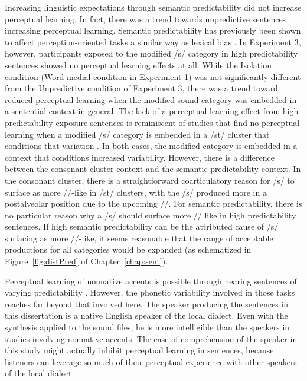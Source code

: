Increasing linguistic expectations through semantic predictability did not increase perceptual learning.
In fact, there was a trend towards unpredictive sentences increasing perceptual learning.
Semantic predictability has previously been shown to affect perception-oriented tasks a similar way as lexical bias \citep{Connine1987, Borsky1998}.
In Experiment 3, however, participants exposed to the modified /s/ category in high predictability sentences showed no perceptual learning effects at all.
While the Isolation condition (Word-medial condition in Experiment 1) was not significantly different from the Unpredictive condition of Experiment 3, there was a trend toward reduced perceptual learning when the modified sound category was embedded in a sentential context in general.
The lack of a perceptual learning effect from high predictability exposure sentences is reminiscent of studies that find no perceptual learning when a modified /s/ category is embedded in a /st\textturnr/ cluster that conditions that variation \citep{Kraljic2008a}.
In both cases, the modified category is embedded in a context that conditions increased variability.
However, there is a difference between the consonant cluster context and the semantic predictability context.
In the consonant cluster, there is a straightforward coarticulatory reason for /s/ to surface as more /\textesh/-like in /st\textturnr/ clusters, with the /s/ produced more in a postalveolar position due to the upcoming /\textturnr/.
For semantic predictability, there is no particular reason why a /s/ should surface more /\textesh/ like in high predictability sentences.
If high semantic predictability can be the attributed cause of /s/ surfacing as more /\textesh/-like, it seems reasonable that the range of acceptable productions for all categories would be expanded (as schematized in Figure~\ref{fig:distPred} of Chapter~\ref{chap:sent}).

Perceptual learning of nonnative accents is possible through hearing sentences of varying predictability \citep[and others]{Bradlow2008}.
However, the phonetic variability involved in those tasks reaches far beyond that involved here.  
The speaker producing the sentences in this dissertation is a native English speaker of the local dialect.
Even with the synthesis applied to the sound files, he is more intelligible than the speakers in studies involving nonnative accents.
The ease of comprehension of the speaker in this study might actually inhibit perceptual learning in sentences, because listeners can leverage so much of their perceptual experience with other speakers of the local dialect.

